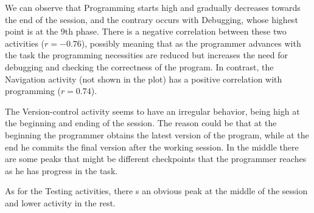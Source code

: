 We can observe that Programming starts high and gradually decreases towards the end of the session, and the contrary occurs with Debugging, whose highest point is at the 9th phase. There is a negative correlation between these two activities ($r=-0.76$), possibly meaning that as the programmer advances with the task the programming necessities are reduced but increases the need for debugging and checking the correctness of the program. In contrast, the Navigation activity (not shown in the plot) has a positive correlation with programming ($r=0.74$).

The Version-control activity seems to have an irregular behavior, being high at the beginning and ending of the session. The reason could be that at the beginning the programmer obtains the latest version of the program, while at the end he commits the final version after the working session. In the middle there are some peaks that might be different checkpoints that the programmer reaches as he has progress in the task. 

As for the Testing activities, there s an obvious peak at the middle of the session and lower activity in the rest.
